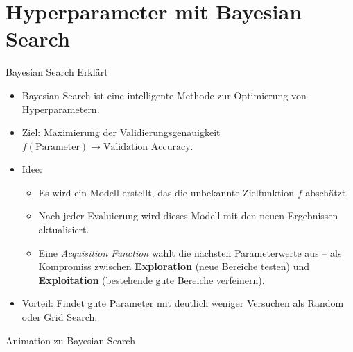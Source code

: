 \section{Hyperparameter mit Bayesian Search}

\begin{frame}{Bayesian Search Erklärt}
\begin{itemize}
    \item Bayesian Search ist eine intelligente Methode zur Optimierung von Hyperparametern.
    \item Ziel: Maximierung der Validierungsgenauigkeit $f(\text{Parameter}) \rightarrow \text{Validation Accuracy}$.
    \item Idee:
        \begin{itemize}
            \item Es wird ein Modell erstellt, das die unbekannte Zielfunktion $f$ abschätzt.
            \item Nach jeder Evaluierung wird dieses Modell mit den neuen Ergebnissen aktualisiert.
            \item Eine \textit{Acquisition Function} wählt die nächsten Parameterwerte aus – als Kompromiss zwischen \textbf{Exploration} (neue Bereiche testen) und \textbf{Exploitation} (bestehende gute Bereiche verfeinern).
        \end{itemize}
    \item Vorteil: Findet gute Parameter mit deutlich weniger Versuchen als Random oder Grid Search.
\end{itemize}
\end{frame}

\begin{frame}{Animation zu Bayesian Search}
\centering
{}
\end{frame}

